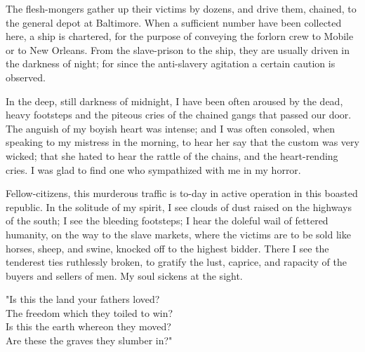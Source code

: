 The flesh-mongers gather up their victims by dozens, and drive them,
chained, to the general depot at Baltimore. When a sufficient number
have been collected here, a ship is chartered, for the purpose of
conveying the forlorn crew to Mobile or to New Orleans. From the
slave-prison to the ship, they are usually driven in the darkness of
night; for since the anti-slavery agitation a certain caution is
observed.

In the deep, still darkness of midnight, I have been often aroused by
the dead, heavy footsteps and the piteous cries of the chained gangs
that passed our door. The anguish of my boyish heart was intense; and I
was often consoled, when speaking to my mistress in the morning, to hear
her say that the custom was very wicked; that she hated to hear the
rattle of the chains, and the heart-rending cries. I was glad to find
one who sympathized with me in my horror.

Fellow-citizens, this murderous traffic is to-day in active operation in
this boasted republic. In the solitude of my spirit, I see clouds of
dust raised on the highways of the south; I see the bleeding footsteps;
I hear the doleful wail of fettered humanity, on the way to the slave
markets, where the victims are to be sold like horses, sheep, and swine,
knocked off to the highest bidder. There I see the tenderest ties
ruthlessly broken, to gratify the lust, caprice, and rapacity of the
buyers and sellers of men. My soul sickens at the sight.

{"}Is this the land your fathers loved?\\
{﻿}The freedom which they toiled to win?\\
Is this the earth whereon they moved?\\
{﻿}Are these the graves they slumber in?"

